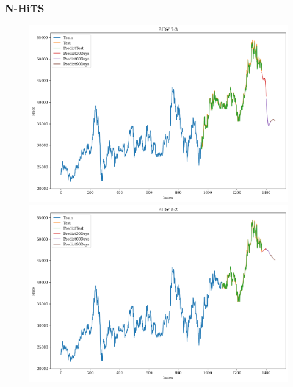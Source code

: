 \subsubsection{N-HiTS}
\begin{figure}[H]
    \centering
    \begin{minipage}{0.15\textwidth}
    \centering
    \includegraphics[width=1\textwidth]{resources/chapter-5/newdata1/result/BIDV_N-HiTS_7-3.png}
    \end{minipage}
    \hfill
    \begin{minipage}{0.15\textwidth}
    \centering
    \includegraphics[width=1\textwidth]{resources/chapter-5/newdata1/result/BIDV_N-HiTS_8-2.png}
    \end{minipage}
    \hfill
        \begin{minipage}{0.15\textwidth}
    \centering

\end{minipage}
\end{figure}
